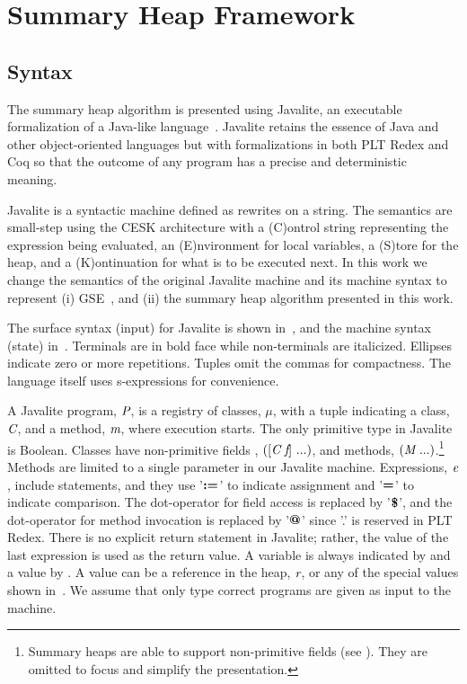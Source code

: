 \section{Summary Heap Framework}
\subsection{Syntax}
The summary heap algorithm is presented using Javalite, an
executable formalization of a Java-like language~\cite{saints-MS}. Javalite retains 
the essence of Java and other object-oriented languages but with formalizations 
in both PLT Redex and Coq so that the outcome of any program has a precise
and deterministic meaning.

Javalite is a syntactic machine defined as rewrites on a string.  The
semantics are small-step using the CESK architecture with a (C)ontrol string
representing the expression being evaluated, an (E)nvironment for
local variables, a (S)tore for the heap, and a (K)ontinuation for what
is to be executed next.  In this work we change the semantics of the original
 Javalite machine and its machine syntax to represent (i) GSE~\cite{GSE03}, and (ii) the summary heap algorithm
presented in this work.

The surface syntax (input) for Javalite is shown 
in~, and the machine syntax (state)
in~. Terminals are in bold face while
non-terminals are italicized. Ellipses indicate zero or more
repetitions. Tuples omit the commas for compactness. The language
itself uses s-expressions for convenience.




A Javalite program, $\emph{P}$, is a registry of classes, $\mu$, with
a tuple indicating a class, $\emph{C}$, and a method, $\emph{m}$,
where execution starts. The only primitive type in Javalite is
Boolean. Classes have non-primitive fields , $([\emph{C}\ \emph{f}]\ ...)$, and
methods, $(\emph{M}\ ...)$.\footnote{Summary heaps are able to support non-primitive fields (see ). They are omitted to focus and simplify the presentation.} Methods are limited to a single
parameter in our Javalite machine. Expressions, $\emph{e}$,  
include statements, and they
 use '$\textbf{:=}$' to indicate assignment and '$\textbf{=}$' to indicate comparison.
The dot-operator for field access is replaced by '$\textbf{\$}$', and the dot-operator
for method invocation is replaced by '$\textbf{@}$' since '.' is reserved in PLT Redex. There is no explicit return
statement in Javalite; rather, the value of the last expression is
used as the return value. A variable is always indicated by 
and a value by . A value can be a reference in the heap, $\emph{r}$, or any of the special values shown in~. 
We assume that only
type correct programs are given as input to the machine.

